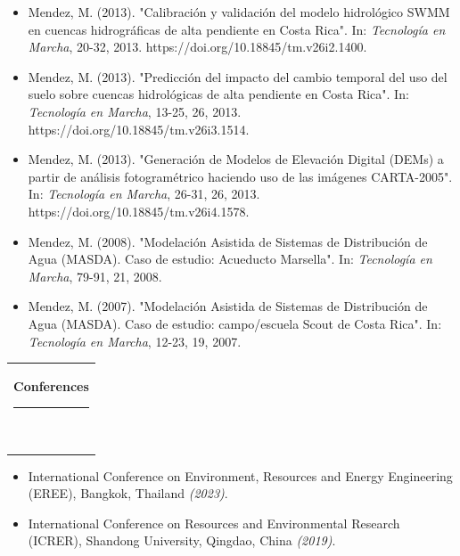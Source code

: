 \documentclass[10pt,letterpaper,english]{article}
\newcommand{\mpwidth}{\linewidth-\fboxsep-\fboxsep}
\newcommand{\cvtext}[1] {
	\begin{tabular*}{1\mpwidth}{p{0.98\mpwidth}}
		\parbox{1\mpwidth}{#1}
	\end{tabular*}
}
\newcommand{\cvsection}[1] {
	\vspace{14pt}
	\cvtext{
		\textbf{\LARGE{\textcolor{darkcol}{#1}}}\\[-4pt]
		\textcolor{accentcol}{ \rule{0.2\textwidth}{1.5pt} } \\
	}
}
\begin{document}
\begin{paracol}{2}
\begin{rightcolumn}
\begin{itemize}[leftmargin=*]
\item Mendez, M. (2013). "Calibración y validación del modelo hidrológico SWMM en cuencas hidrográficas  de alta pendiente en Costa Rica". In: \textit{Tecnología en Marcha}, 20-32, 2013. \newline https://doi.org/10.18845/tm.v26i2.1400.
\item Mendez, M. (2013). "Predicción del impacto del cambio temporal del uso del suelo sobre cuencas hidrológicas de alta pendiente en Costa Rica". In: \textit{Tecnología en Marcha}, 13-25, 26, 2013. \newline https://doi.org/10.18845/tm.v26i3.1514.
\item Mendez, M. (2013). "Generación de Modelos de Elevación Digital (DEMs) a partir de análisis fotogramétrico haciendo uso de las imágenes CARTA-2005". In: \textit{Tecnología en Marcha}, 26-31, 26, 2013. \newline https://doi.org/10.18845/tm.v26i4.1578.
\item Mendez, M. (2008). "Modelación Asistida de Sistemas de Distribución de Agua (MASDA). Caso de estudio: Acueducto Marsella". In: \textit{Tecnología en Marcha}, 79-91, 21, 2008. %
\item Mendez, M. (2007). "Modelación Asistida de Sistemas de Distribución de Agua (MASDA). Caso de estudio: campo/escuela Scout de Costa Rica". In: \textit{Tecnología en Marcha}, 12-23, 19, 2007. %
\end{itemize}


\vspace{10pt}
\cvsection{Conferences}
\vspace{4pt}

\begin{itemize}[leftmargin=*]

\item International Conference on Environment, Resources and Energy Engineering (EREE), Bangkok, Thailand
\textit{(2023)}.

\item International Conference on Resources and Environmental Research (ICRER), Shandong University, Qingdao, China \textit{(2019)}.


\end{itemize}
\end{rightcolumn}
\end{paracol}
\end{document}
